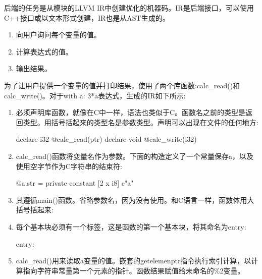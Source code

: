 
后端的任务是从模块的LLVM IR中创建优化的机器码。IR是后端接口，可以使用C++接口或以文本形式创建，IR也是从AST生成的。


\begin{enumerate}
\item
向用户询问每个变量的值。

\item
计算表达式的值。

\item
输出结果。
\end{enumerate}

为了让用户提供一个变量的值并打印结果，使用了两个库函数:calc\_read()和calc\_write()。对于with a: 3*a表达式，生成的IR如下所示:

\begin{enumerate}
\item
必须声明库函数，就像在C中一样，语法也类似于C。函数名之前的类型是返回类型。用括号括起来的类型名是参数类型。声明可以出现在文件的任何地方:

\begin{shell}
declare i32 @calc_read(ptr)
declare void @calc_write(i32)
\end{shell}

\item
calc\_read()函数将变量名作为参数。下面的构造定义了一个常量保存a，以及使用空字节作为C字符串的结束符:

\begin{shell}
@a.str = private constant [2 x i8] c"a"
\end{shell}

\item
其遵循main()函数。省略参数名，因为没有使用。和C语言一样，函数体用大括号括起来:

\begin{shell}
define i32 @main(i32, ptr) {
\end{shell}

\item
每个基本块必须有一个标签，这是函数的第一个基本块，将其命名为entry:

\begin{shell}
entry:
\end{shell}

\item
calc\_read()用来读取a变量的值。嵌套的getelemenptr指令执行索引计算，以计算指向字符串常量第一个元素的指针。函数结果赋值给未命名的\%2变量。

\begin{shell}
\end{shell}


\end{enumerate}
